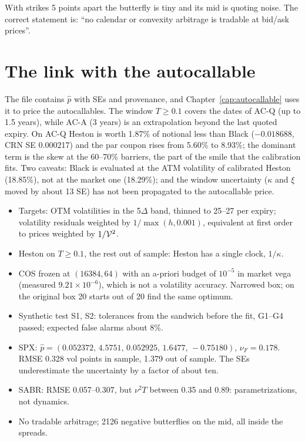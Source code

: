 \begin{attenzione}
With strikes 5 points apart the butterfly is tiny and its mid is quoting noise. The correct statement is: ``no
calendar or convexity arbitrage is tradable at bid/ask prices''.
\end{attenzione}

\section{The link with the autocallable}
The file  contains $\hat p$ with SEs and provenance, and Chapter~\ref{cap:autocallable} uses it to price the autocallables. The window $T\ge0.1$ covers the dates of \mbox{AC-Q} (up to
1.5 years), while \mbox{AC-A} (3 years) is an extrapolation beyond the last quoted expiry. On \mbox{AC-Q} Heston is
worth 1.87\% of notional less than Black ($-0.018688$, CRN SE 0.000217) and the par coupon rises from 5.60\% to
8.93\%; the dominant term is the skew at the 60--70\% barriers, the part of the smile that the calibration fits. Two
caveats: Black is evaluated at the ATM volatility of calibrated Heston (18.85\%), not at the market one (18.29\%); and
the window uncertainty ($\kappa$ and $\xi$ moved by about 13 SE) has not been propagated to the autocallable price.

\begin{riassunto}
\begin{itemize}
\item Targets: OTM volatilities in the 5$\Delta$ band, thinned to 25--27 per expiry; volatility residuals weighted by
$1/\max(h,0.001)$, equivalent at first order to prices weighted by $1/\mathcal{V}^2$.
\item Heston on $T\ge0.1$, the rest out of sample: Heston has a single clock, $1/\kappa$.
\item COS frozen at $(16384,64)$ with an a-priori budget of $10^{-5}$ in market vega (measured $9.21\times10^{-6}$),
which is not a volatility accuracy. Narrowed box; on the original box 20 starts out of 20 find the same optimum.
\item Synthetic test S1, S2: tolerances from the sandwich before the fit, G1--G4 passed; expected false alarms about 8\%.
\item SPX: $\hat p=(0.052372,\,4.5751,\,0.052925,\,1.6477,\,-0.75180)$, $\nu_F=0.178$. RMSE 0.328 vol points in sample,
1.379 out of sample. The SEs underestimate the uncertainty by a factor of about ten.
\item SABR: RMSE 0.057--0.307, but $\nu^2T$ between 0.35 and 0.89: parametrizations, not dynamics.
\item No tradable arbitrage; 2126 negative butterflies on the mid, all inside the spreads.
\end{itemize}
\end{riassunto}

